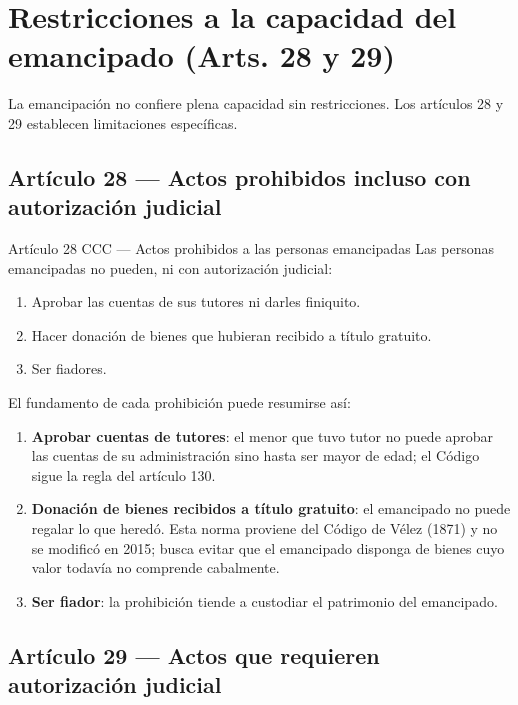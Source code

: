 \documentclass[12pt,oneside]{book}
\begin{document}
\section{Restricciones a la capacidad del emancipado (Arts. 28 y 29)}

La emancipación no confiere plena capacidad sin restricciones. Los artículos 28 y 29 establecen limitaciones específicas.

\subsection{Artículo 28 — Actos prohibidos incluso con autorización judicial}

\begin{definition}{Artículo 28 CCC — Actos prohibidos a las personas emancipadas}
Las personas emancipadas no pueden, ni con autorización judicial:
\begin{enumerate}
    \item Aprobar las cuentas de sus tutores ni darles finiquito.
    \item Hacer donación de bienes que hubieran recibido a título gratuito.
    \item Ser fiadores.
\end{enumerate}
\end{definition}

El fundamento de cada prohibición puede resumirse así:

\begin{enumerate}
    \item \textbf{Aprobar cuentas de tutores}: el menor que tuvo tutor no puede aprobar las cuentas de su administración sino hasta ser mayor de edad; el Código sigue la regla del artículo 130.
    \item \textbf{Donación de bienes recibidos a título gratuito}: el emancipado no puede regalar lo que heredó. Esta norma proviene del Código de Vélez (1871) y no se modificó en 2015; busca evitar que el emancipado disponga de bienes cuyo valor todavía no comprende cabalmente.
    \item \textbf{Ser fiador}: la prohibición tiende a custodiar el patrimonio del emancipado.
\end{enumerate}

\subsection{Artículo 29 — Actos que requieren autorización judicial}
\end{document}
